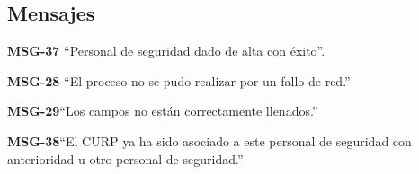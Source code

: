 \subsection{Mensajes}

\begin{Citemize}
    \item {\bf MSG-37} ``Personal de seguridad dado de alta con éxito''.
    \item {\bf MSG-28}  ``El proceso no se pudo realizar por un fallo de red.''
    \item {\bf MSG-29}{``Los campos no están correctamente llenados.''}
    \item {\bf MSG-38}{``El CURP ya ha sido asociado a este personal de seguridad con anterioridad u otro personal de seguridad.''}
    
\end{Citemize}
